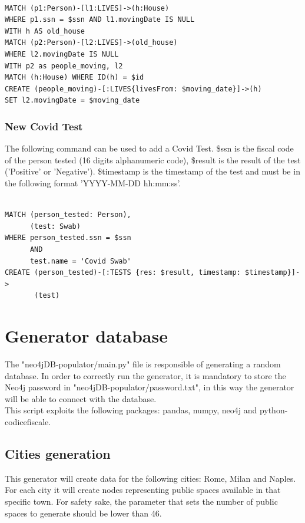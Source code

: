 \documentclass{article}
\begin{document}
\begin{lstlisting}[language=cypher, label=lst:cypher-example]

MATCH (p1:Person)-[l1:LIVES]->(h:House)
WHERE p1.ssn = $ssn AND l1.movingDate IS NULL
WITH h AS old_house
MATCH (p2:Person)-[l2:LIVES]->(old_house)
WHERE l2.movingDate IS NULL
WITH p2 as people_moving, l2
MATCH (h:House) WHERE ID(h) = $id
CREATE (people_moving)-[:LIVES{livesFrom: $moving_date}]->(h)
SET l2.movingDate = $moving_date

\end{lstlisting}
\newpage
\subsubsection{New Covid Test}
The following command can be used to add a Covid Test. \$ssn is the fiscal code of the person tested (16 digits alphanumeric code), \$result is the result of the test ('Positive' or 'Negative'). \$timestamp is the timestamp of the test and must be in the following format 'YYYY-MM-DD hh:mm:ss'.

\begin{lstlisting}[language=cypher, label=lst:cypher-example]

MATCH (person_tested: Person),
      (test: Swab)
WHERE person_tested.ssn = $ssn
      AND
      test.name = 'Covid Swab'
CREATE (person_tested)-[:TESTS {res: $result, timestamp: $timestamp}]->
       (test)

\end{lstlisting}
\newpage
\section{Generator database}
The {\selectfont"neo4jDB-populator/main.py"} file is responsible of generating a random database.
In order to correctly run the generator, it is mandatory to store the Neo4j password in {\selectfont"neo4jDB-populator/password.txt"}, in this way the generator will be able to connect with the database.
\\This script exploits the following packages: {\selectfont pandas, numpy, neo4j and python-codicefiscale}.

\subsection{Cities generation}
This generator will create data for the following cities: Rome, Milan and Naples. For each city it will create nodes representing public spaces available in that specific town. For safety sake, the parameter that sets the number of public spaces to generate should be lower than 46.
\end{document}
